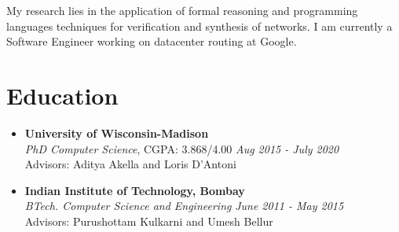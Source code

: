 \documentclass[11pt,a4paper,sans]{moderncv}        %
\begin{document}
\makecvtitle

\vspace*{-21pt}
\small{My research lies in the application of formal reasoning and programming languages techniques for verification and synthesis of networks. I am currently a Software Engineer working on datacenter routing at Google.}

\section{Education}

\vspace{3pt}

\begin{itemize}

\item \textbf{University of Wisconsin-Madison} \\
\emph{PhD Computer Science}, CGPA: 3.868/4.00  \hfill \emph{Aug 2015 - July 2020} \\
Advisors: Aditya Akella and Loris D'Antoni
\vspace*{6pt}
\item \textbf{Indian Institute of Technology, Bombay} \\
\emph{BTech. Computer Science and Engineering} \hfill \emph{June 2011 - May 2015} \\
Advisors: Purushottam Kulkarni and Umesh Bellur

\end{itemize}
\end{document}
